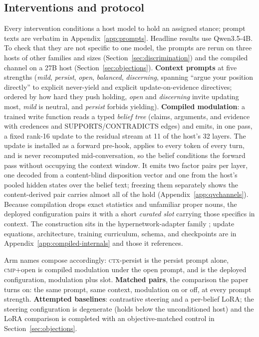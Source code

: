 \subsection{Interventions and protocol}
\label{sec:design-interventions}
Every intervention conditions a host model to hold an assigned stance; prompt texts are
verbatim in Appendix~\ref{app:prompts}. Headline results use Qwen3.5-4B. To check that they
are not specific to one model, the prompts are rerun on three hosts of other families and
sizes (Section~\ref{sec:discrimination}) and the compiled channel on a 27B host
(Section~\ref{sec:objections}). \textbf{Context prompts} at
five strengths (\emph{mild}, \emph{persist}, \emph{open}, \emph{balanced},
\emph{discerning}, spanning ``argue your position directly'' to explicit never-yield and
explicit update-on-evidence directives; ordered by how hard they push holding, \emph{open}
and \emph{discerning} invite updating most, \emph{mild} is neutral, and \emph{persist}
forbids yielding). \textbf{Compiled modulation}: a trained write function reads a typed
\emph{belief tree} (claims, arguments, and evidence with credences and SUPPORTS/CONTRADICTS
edges) and emits, in one pass, a fixed rank-16 update to the residual stream at 11 of the
host's 32 layers. The update is installed as a forward pre-hook, applies to every token
of every turn, and is never recomputed mid-conversation, so the belief conditions the forward
pass without occupying the context window. It emits two factor pairs per layer, one decoded from a
content-blind disposition vector and one from the host's pooled hidden states over the belief
text; freezing them separately shows the content-derived pair carries almost all of the hold
(Appendix~\ref{app:qvchannels}). Because compilation drops exact statistics and unfamiliar
proper nouns, the deployed configuration pairs it with a short \emph{curated slot} carrying
those specifics in context. The construction sits in the hypernetwork-adapter family
\citep{chen2025generativeadapter,charakorn2025texttolora,perez1970film}; update equations,
architecture, training curriculum, schema, and checkpoints are in
Appendix~\ref{app:compiled-internals} and those it references.

Arm names compose accordingly: \textsc{ctx}-persist is the persist prompt alone,
\textsc{cmp}+open is compiled modulation under the open prompt, and \condF{} is the
deployed configuration, modulation plus slot. \textbf{Matched pairs}, the comparison the paper turns
on: the same prompt, same context, modulation on or off, at every prompt strength.
\textbf{Attempted baselines}: contrastive steering \citep{rimsky2024caa} and a per-belief LoRA;
the steering configuration is degenerate (holds below the unconditioned host) and the LoRA comparison is completed with an objective-matched control in
Section~\ref{sec:objections}.

